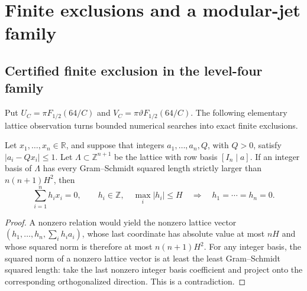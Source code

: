 \section{Finite exclusions and a modular-jet family}
\label{sec:C-certified}
\subsection{Certified finite exclusion in the level-four family}
Put $U_C=\pi F_{1/2}(64/C)$ and
$V_C=\pi\vartheta F_{1/2}(64/C)$.
The following elementary lattice observation turns bounded numerical
searches into exact finite exclusions.

\begin{lemma}
Let $x_1,\ldots,x_n\in\mathbb R$, and suppose that integers
$a_1,\ldots,a_n,Q$, with $Q>0$, satisfy
$|a_i-Qx_i|\le1$. Let $\Lambda\subset\mathbb Z^{n+1}$ be the lattice
with row basis $[I_n\mid a]$. If an integer basis of $\Lambda$ has every
Gram--Schmidt squared length strictly larger than $n(n+1)H^2$, then
\[
 \sum_{i=1}^n h_ix_i=0,\qquad h_i\in\mathbb Z,
 \quad\max_i|h_i|\le H
 \quad\Longrightarrow\quad h_1=\cdots=h_n=0.
\]
\end{lemma}
\begin{proof}
A nonzero relation would yield the nonzero lattice vector
$(h_1,\ldots,h_n,\sum_i h_ia_i)$, whose last coordinate has absolute
value at most $nH$ and whose squared norm is therefore at most
$n(n+1)H^2$. For any integer basis, the squared norm of a nonzero lattice
vector is at least the least Gram--Schmidt squared length: take the
last nonzero integer basis coefficient and project onto the corresponding
orthogonalized direction. This is a contradiction.
\end{proof}

